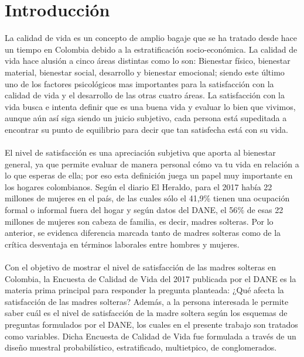 \documentclass[11pt,twoside]{article}
\begin{document}
\section{Introducción}
\noindent
La calidad de vida es un concepto de amplio bagaje que se ha tratado desde hace un tiempo en Colombia debido a la estratificación socio-económica. La calidad de vida hace alusión a cinco áreas distintas como lo son: Bienestar físico, bienestar material, bienestar social, desarrollo y bienestar emocional; siendo este último uno de los factores psicológicos mas importantes para la satisfacción con la calidad de vida y el desarrollo de las otras cuatro áreas. La satisfacción con la vida busca e intenta definir  que es una buena vida y evaluar lo bien que vivimos, aunque aún así siga siendo un juicio subjetivo, cada persona está supeditada a encontrar su punto de equilibrio para decir que tan satisfecha está con su vida.
\\
\\
\noindent
El nivel de satisfacción es una apreciación subjetiva que aporta al bienestar general, ya que permite evaluar de manera personal cómo va tu vida en relación a lo que esperas de ella; por eso esta definición juega un papel muy importante en los hogares colombianos. Según el diario El Heraldo, para el 2017 había 22 millones de mujeres en el país, de las cuales sólo el 41,9{\%} tienen una ocupación formal o informal fuera del hogar y según datos del DANE, el 56{\%} de esas 22 millones de mujeres son cabeza de familia, es decir, madres solteras. Por lo anterior, se evidenca diferencia marcada tanto de madres solteras como de la crítica desventaja en términos laborales entre hombres y mujeres.
\\
\\
\noindent
Con el objetivo de mostrar el nivel de satisfacción de las madres solteras en Colombia, la Encuesta de Calidad de Vida del 2017 publicada por el DANE es la materia prima principal para responder la pregunta planteada: ¿Qué afecta la satisfacción de las madres solteras? Además, a la persona interesada le permite saber cuál es el nivel de satisfacción de la madre soltera según los esquemas de preguntas formulados por el DANE, los cuales en el presente trabajo son tratados como variables. Dicha Encuesta de Calidad de Vida fue formulada a través de un diseño muestral probabilístico, estratificado, multietpico, de conglomerados.
\\
\\
\end{document}
